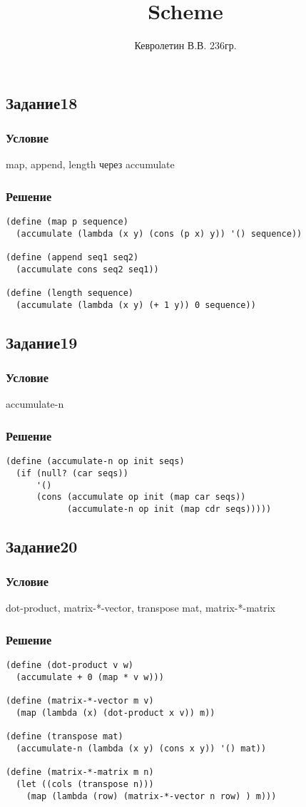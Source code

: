 \documentclass[10pt,a4paper]{article}
\author{Кевролетин В.В. 236гр.}
\title{Scheme}
\begin{document}
\maketitle

\subsection*{Задание18}
\subsubsection*{Условие}
map, append, length через accumulate
\subsubsection*{Решение}
\begin{lstlisting}
(define (map p sequence)
  (accumulate (lambda (x y) (cons (p x) y)) '() sequence))

(define (append seq1 seq2)
  (accumulate cons seq2 seq1))

(define (length sequence)
  (accumulate (lambda (x y) (+ 1 y)) 0 sequence))
\end{lstlisting}

\subsection*{Задание19}
\subsubsection*{Условие}
accumulate-n 
\subsubsection*{Решение}
\begin{lstlisting}
(define (accumulate-n op init seqs)
  (if (null? (car seqs))
      '()
      (cons (accumulate op init (map car seqs))
            (accumulate-n op init (map cdr seqs)))))
\end{lstlisting}

\subsection*{Задание20}
\subsubsection*{Условие}
dot-product, matrix-*-vector, transpose mat, matrix-*-matrix 
\subsubsection*{Решение}
\begin{lstlisting}
(define (dot-product v w)
  (accumulate + 0 (map * v w)))

(define (matrix-*-vector m v)
  (map (lambda (x) (dot-product x v)) m))

(define (transpose mat)
  (accumulate-n (lambda (x y) (cons x y)) '() mat))

(define (matrix-*-matrix m n)
  (let ((cols (transpose n)))
    (map (lambda (row) (matrix-*-vector n row) ) m)))
\end{lstlisting}
\end{document}
